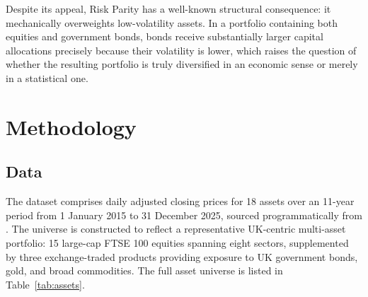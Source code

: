\documentclass[a4paper,alpha-refs]{scr-contemporary}
\numberwithin{equation}{section}
\begin{document}
\indent Despite its appeal, Risk Parity has a well-known structural consequence:
it mechanically overweights low-volatility assets. In a portfolio containing
both equities and government bonds, bonds receive substantially larger
capital allocations precisely because their volatility is lower, which raises
the question of whether the resulting portfolio is truly diversified in an
economic sense or merely in a statistical one.
\section{Methodology}
\label{sec:methodology}

\subsection{Data}
\label{sec:data}

\indent \indent The dataset comprises daily adjusted closing prices for 18 assets
over an 11-year period from 1 January 2015 to 31 December 2025, sourced
programmatically from \citeauthor{yahoo_finance}. The universe is constructed to reflect a
representative UK-centric multi-asset portfolio: 15 large-cap FTSE 100 equities
spanning eight sectors, supplemented by three exchange-traded products providing
exposure to UK government bonds, gold, and broad commodities. The full asset
universe is listed in Table~\ref{tab:assets}.
\end{document}
